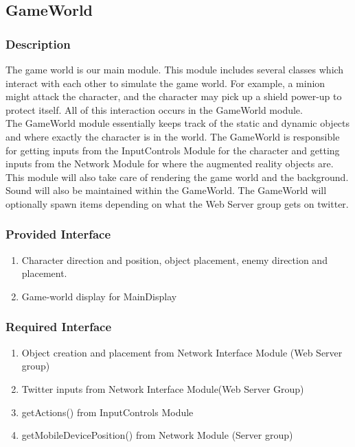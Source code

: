 \documentclass[10pt,letterpaper,oneside,english]{article}
\begin{document}
\subsection{GameWorld}

\subsubsection{Description}
The game world is our main module. This module includes several classes which interact with each other to simulate the game world. For example, a minion might attack the character, and the character may pick up a shield power-up to protect itself. All of this interaction occurs in the GameWorld module.\\
The GameWorld module essentially keeps track of the static and dynamic objects and where exactly the character is in the world. The GameWorld is responsible for getting inputs from the InputControls Module for the character and getting inputs from the Network Module for where the augmented reality objects are. This module will also take care of rendering the game world and the background. Sound will also be maintained within the GameWorld. The GameWorld will optionally spawn items depending on what the Web Server group gets on twitter.

\subsubsection{Provided Interface}
\begin{enumerate}
	\item Character direction and position, object placement, enemy direction and placement.
 	\item Game-world display for MainDisplay    
\end{enumerate}

\subsubsection{Required Interface}
\begin{enumerate}
    \item Object creation and placement from Network Interface Module (Web Server group)
	\item Twitter inputs from Network Interface Module(Web Server Group)
	\item getActions() from InputControls Module
	\item getMobileDevicePosition() from Network Module (Server group)
\end{enumerate}
\end{document}
